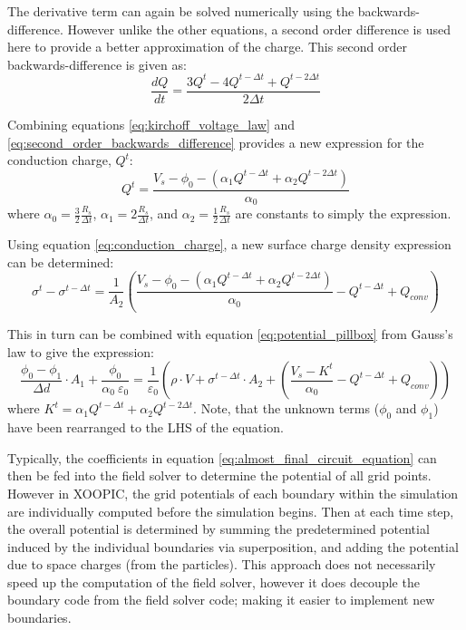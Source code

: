The derivative term can again be solved numerically using the backwards-difference. However unlike the other equations, a second order difference is used here to provide a better approximation of the charge. This second order backwards-difference is given as:
\begin{equation}
	\frac{dQ}{dt} = \frac{3Q^t - 4Q^{t - \Delta t} + Q^{t - 2\Delta t}}{2 \Delta t}
	\label{eq:second_order_backwards_difference}
\end{equation}

Combining equations \ref{eq:kirchoff_voltage_law} and \ref{eq:second_order_backwards_difference} provides a new expression for the  conduction charge, $Q^t$:
\begin{equation}
	Q^t = \frac{V_s - \phi_0 - (\alpha_1 Q^{t - \Delta t} + \alpha_2 Q^{t - 2\Delta t})}{\alpha_0}
	\label{eq:conduction_charge}
\end{equation}
where $\alpha_0 = \frac{3}{2}\frac{R_s}{\Delta t}$,  $\alpha_1 = 2\frac{R_s}{\Delta t}$, and  $\alpha_2 = \frac{1}{2}\frac{R_s}{\Delta t}$ are constants to simply the expression. 

Using equation \ref{eq:conduction_charge}, a new surface charge density expression can be determined:
\begin{equation}
	\sigma^t - \sigma^{t - \Delta t} = \frac{1}{A_2} \left(\frac{V_s - \phi_0 - (\alpha_1 Q^{t - \Delta t} + \alpha_2 Q^{t - 2\Delta t})}{\alpha_0} - Q^{t - \Delta t} + Q_{conv} \right)
	\label{eq:final_surface_charge}
\end{equation}

This in turn can be combined with equation \ref{eq:potential_pillbox} from Gauss's law to give the expression:
\begin{equation}
	\frac{\phi_0 - \phi_1}{\Delta d} \cdot A_1 + \frac{\phi_0}{\alpha_0 \  \varepsilon_0} = \frac{1}{\varepsilon_0} \left(\rho \cdot V + \sigma^{t - \Delta t} \cdot A_2 + \left(\frac{V_s - K^t}{\alpha_0} - Q^{t - \Delta t} + Q_{conv} \right) \right)
	\label{eq:almost_final_circuit_equation}
\end{equation}
where $K^t = \alpha_1 Q^{t - \Delta t} + \alpha_2 Q^{t - 2\Delta t}$. Note, that the unknown terms ($\phi_0$ and $\phi_1$) have been rearranged to the  LHS of the equation.

Typically, the coefficients in equation \ref{eq:almost_final_circuit_equation} can then be fed into the field solver to determine the potential of all grid points. However in XOOPIC, the grid potentials of each boundary within the simulation are individually computed before the simulation begins. Then at each time step, the overall potential is determined by summing the predetermined potential induced by the individual boundaries via superposition, and adding the potential due to space charges (from the particles). This approach does not necessarily speed up the computation of the field solver, however it does decouple the boundary code  from the field solver code; making it easier to implement new boundaries.

